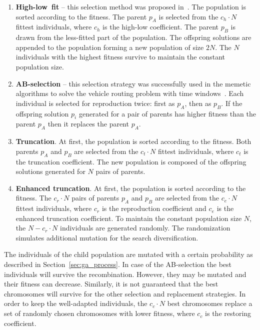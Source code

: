 \documentclass{llncs}
\begin{document}
  
\begin{enumerate}
\item{\bf{High-low~fit}} -- this selection method was proposed in~\cite{Ali2006}. The population is sorted according to the fitness. The parent $p_{A}$ is selected from the $c_{h}\cdot N$ fittest individuals, where $c_{h}$ is the high-low coefficient. The parent $p_{B}$ is drawn from the less-fitted part of the population. The offspring solutions are appended to the population forming a new population of size $2N$. The $N$ individuals with the highest fitness survive to maintain the constant population size.

\item{\bf{AB-selection}} -- this selection strategy was successfully used in the memetic algorithms to solve the vehicle routing problem with time windows~\cite{Braysy2010, Nalepa2012}. Each individual is selected for reproduction twice: first as $p_{A}$, then as $p_{B}$. If the offspring solution $p_{i}$ generated for a pair of parents has higher fitness than the parent $p_{A}$ then it replaces the parent $p_{A}$.
\item{\bf{Truncation}}. At first, the population is sorted according to the fitness. Both parents $p_{A}$ and $p_{B}$ are selected from the $c_{t}\cdot N$ fittest individuals, where $c_{t}$ is the truncation coefficient. The new population is composed of the offspring solutions generated for $N$ pairs of parents.
\item{\bf{Enhanced truncation}}. At first, the population is sorted according to the fitness. The $c_{r}\cdot N$ pairs of parents $p_{A}$ and $p_{B}$ are selected from the $c_{e}\cdot N$ fittest individuals, where $c_{r}$ is the reproduction coefficient and $c_{e}$ is the enhanced truncation coefficient. To maintain the constant population size $N$, the $N-c_{r}\cdot N$ individuals are generated randomly. The randomization simulates additional mutation for the search diversification.
\end{enumerate}

The individuals of the child population are mutated with a certain
probability as described in Section~\ref{sec:ga_process}. In case of
the AB-selection the best individuals will
survive the recombination. However, they may be mutated and their
fitness can decrease. Similarly, it is not guaranteed that the best
chromosomes will survive for the other selection and replacement
strategies. In order to keep the well-adapted individuals, the
$c_{c}\cdot N$ best chromosomes replace a set of randomly chosen
chromosomes with lower fitness, where $c_{c}$ is the restoring
coefficient.
\end{document}
